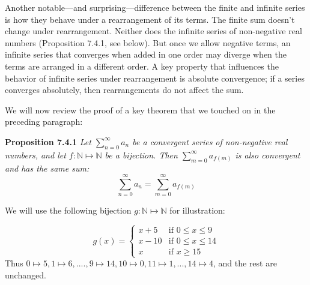 \documentclass{article}
\begin{document}
Another notable---and surprising---difference between the finite and infinite series is how they behave under a rearrangement of its terms. The finite sum doesn't change under rearrangement. Neither does the infinite series of non-negative real numbers (Proposition 7.4.1, see below). But once we allow negative terms, an infinite series that converges when added in one order may diverge when the terms are arranged in a different order. A key property that influences the behavior of infinite series under rearrangement is absolute convergence; if a series converges absolutely, then rearrangements do not affect the sum.

We will now review the proof of a key theorem that we touched on in the preceding paragraph:

\textbf{Proposition 7.4.1} \textit{Let $\sum_{n=0}^\infty a_n$ be a convergent series of non-negative real numbers, and let $f:\mathbb{N} \mapsto \mathbb{N}$ be a bijection. Then $\sum_{m=0}^\infty a_{f(m)}$ is also convergent and has the same sum: 
\[ \sum_{n=0}^\infty a_n = \sum_{m=0}^\infty a_{f(m)} \]
}

We will use the following bijection $g:\mathbb{N} \mapsto \mathbb{N}$ for illustration: 

\[ g(x) = \begin{cases}
x + 5 & \text{if } 0 \leq x \leq 9 \\
x -10 & \text{if } 0 \leq x \leq 14 \\
x & \text{if } x \geq 15
\end{cases}
\]
Thus $0 \mapsto 5, 1 \mapsto 6, ...., 9 \mapsto 14, 10 \mapsto 0, 11 \mapsto 1, ..., 14 \mapsto 4$, and the rest are unchanged.
\end{document}
